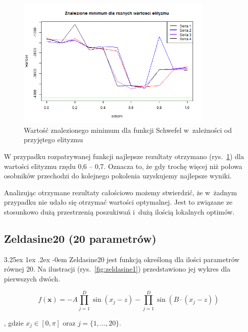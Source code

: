 \documentclass[11pt, a4paper]{article}
\makeatletter
\newcommand{\fbi}{\leavevmode{\parindent=1em\indent}}
\renewcommand\paragraph{\@startsection{paragraph}{5}{\z@}
  {3.25ex \@plus1ex \@minus.2ex}
  {-0em}
  {\normalfont\normalsize\bfseries}}
\makeatother
\begin{document}
\begin{figure}[H]
	\begin{center}
		\includegraphics[width=0.85\textwidth]{./assets/Schwefel6.png}
		\caption{Wartość znalezionego minimum dla funkcji Schwefel w~zależności od przyjętego elityzmu}
		\label{fig:schwefel6}
	\end{center}
\end{figure}

\fbi
W przypadku rozpatrywanej funkcji najlepsze rezultaty otrzymano (rys.~\ref{fig:schwefel6}) dla wartości elityzmu rzędu 0,6 -- 0,7. Oznacza to, że gdy trochę więcej niż połowa osobników przechodzi do kolejnego pokolenia uzyskujemy najlepsze wyniki.

\fbi
Analizując otrzymane rezultaty całościowo możemy stwierdzić, że w~żadnym przypadku nie udało się otrzymać wartości optymalnej. Jest to związane ze stosunkowo dużą przestrzenią poszukiwań i~dużą ilością lokalnych optimów.

\newpage
\subsection{Zeldasine20 (20 parametrów)}
\paragraph{}
Zeldasine20 jest funkcją określoną dla ilości parametrów równej 20. Na ilustracji (rys.~\ref{fig:zeldasine1}) przedstawiono jej wykres dla pierwszych dwóch.

\begin{equation}\label{eq:zeldasine}
f(\boldsymbol{x}) = -A \prod_{j=1}^{D} \sin (x_j - z) - \prod_{j=1}^{D} \sin (B \cdot (x_j - z))
\end{equation}

, gdzie $ x_j \in [0, \pi]$ oraz $j = \{1, ..., 20\}$.
\end{document}
